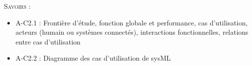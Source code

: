 \documentclass[11pt,oneside]{article}
\begin{document}
%
%
%
%

\vspace{.5cm}

\begin{center}
\end{center}






\begin{savoir}
\textsc{Savoirs :}
\begin{itemize}
\item A-C2.1	: Frontière d'étude, fonction globale et performance, cas d’utilisation, acteurs (humain ou systèmes connectés), interactions fonctionnelles, relations entre cas d’utilisation	
\item A-C2.2	: Diagramme des cas d’utilisation de sysML	
\end{itemize}
\end{savoir}
 
\end{document}
